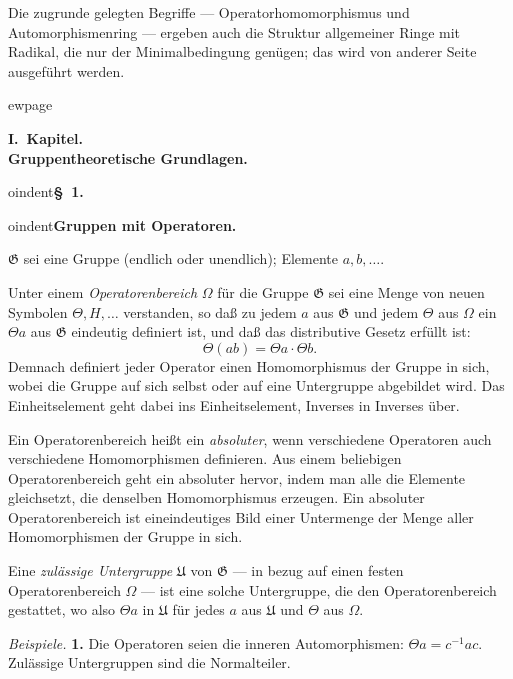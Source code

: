\documentclass[12pt,a4paper]{article}
\theoremstyle{definition}
\begin{document}
Die zugrunde gelegten Begriffe --- Operatorhomomorphismus und
Automorphismenring --- ergeben auch die Struktur allgemeiner Ringe mit
Radikal, die nur der Minimalbedingung gen\"ugen; das wird von anderer
Seite ausgef\"uhrt werden.



ewpage
\setcounter{page}{581}

\begin{center}
\textbf{I.~Kapitel.}\\[0.3em]
\textbf{Gruppentheoretische Grundlagen.}
\end{center}

\medskip



oindent\textbf{\S~1.}



oindent\textbf{Gruppen mit Operatoren.}

$\mathfrak{G}$ sei eine Gruppe (endlich oder unendlich); Elemente $a,
b, \dots$.

Unter einem \textit{Operatorenbereich} $\Omega$ f\"ur die Gruppe
$\mathfrak{G}$ sei eine Menge von neuen Symbolen $\Theta, H, \dots$
verstanden, so da\ss{} zu jedem $a$ aus $\mathfrak{G}$ und jedem $\Theta$
aus $\Omega$ ein $\Theta a$ aus $\mathfrak{G}$ eindeutig definiert ist, und
da\ss{} das distributive Gesetz erf\"ullt ist:
\[
\Theta(ab) = \Theta a \cdot \Theta b.
\]
Demnach definiert jeder Operator einen Homomorphismus der Gruppe in
sich, wobei die Gruppe auf sich selbst oder auf eine Untergruppe
abgebildet wird. Das Einheitselement geht dabei ins Einheitselement,
Inverses in Inverses \"uber.

Ein Operatorenbereich hei\ss t ein \textit{absoluter}, wenn verschiedene
Operatoren auch verschiedene Homomorphismen definieren. Aus einem
beliebigen Operatorenbereich geht ein absoluter hervor, indem man alle
die Elemente gleichsetzt, die denselben Homomorphismus erzeugen. Ein
absoluter Operatorenbereich ist eineindeutiges Bild einer Untermenge der
Menge aller Homomorphismen der Gruppe in sich.

Eine \textit{zul\"assige Untergruppe} $\mathfrak{U}$ von $\mathfrak{G}$ --- in
bezug auf einen festen Operatorenbereich $\Omega$ --- ist eine solche
Untergruppe, die den Operatorenbereich gestattet, wo also $\Theta a$ in
$\mathfrak{U}$ f\"ur jedes $a$ aus $\mathfrak{U}$ und $\Theta$ aus
$\Omega$.

\textit{Beispiele.} \textbf{1.} Die Operatoren seien die inneren
Automorphismen: $\Theta a = c^{-1}ac$. Zul\"assige Untergruppen sind die
Normalteiler.
\end{document}
